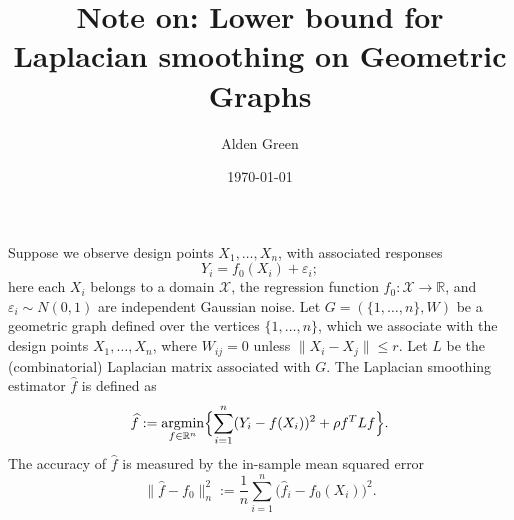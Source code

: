 \documentclass{article}
\newcommand{\Reals}{\mathbb{R}}
\newcommand{\1}{\mathbf{1}}
\DeclareMathOperator*{\argmin}{argmin}
\newcommand{\Lap}{L}
\newcommand{\Xset}{\mathcal{X}}
\newcommand{\wh}[1]{\widehat{#1}}
\theoremstyle{definition}
\theoremstyle{remark}
\begin{document}
\title{Note on: Lower bound for Laplacian smoothing on Geometric Graphs}
\author{Alden Green}
\date{\today}
\maketitle

Suppose we observe design points $X_1,\ldots,X_n$, with associated responses
\begin{equation*}
Y_i = f_0(X_i) + \varepsilon_i;
\end{equation*}
here each $X_i$ belongs to a domain $\Xset$, the regression function $f_0: \Xset \to \Reals$, and $\varepsilon_i \sim N(0,1)$ are independent Gaussian noise. Let $G = (\{1,\ldots,n\},W)$ be a geometric graph defined over the vertices $\{1,\ldots,n\}$, which we associate with the design points $X_1,\ldots,X_n$, where $W_{ij} = 0$ unless $\|X_i - X_j\| \leq r$.  Let $\Lap$ be the (combinatorial) Laplacian matrix associated with $G$. The Laplacian smoothing estimator $\wh{f}$ is defined as
\begin{equation*}
\wh{f} := \argmin_{f \in \Reals^n} \Bigl\{\sum_{i = 1}^{n} (Y_i - f(X_i))^2 + \rho f^T \Lap f\Bigr\}.
\end{equation*}
The accuracy of $\wh{f}$ is measured by the in-sample mean squared error
\begin{equation*}
\|\wh{f} - f_0\|_n^2 := \frac{1}{n} \sum_{i = 1}^{n} \bigl(\wh{f}_i - f_0(X_i)\bigr)^2.
\end{equation*}
\end{document}
